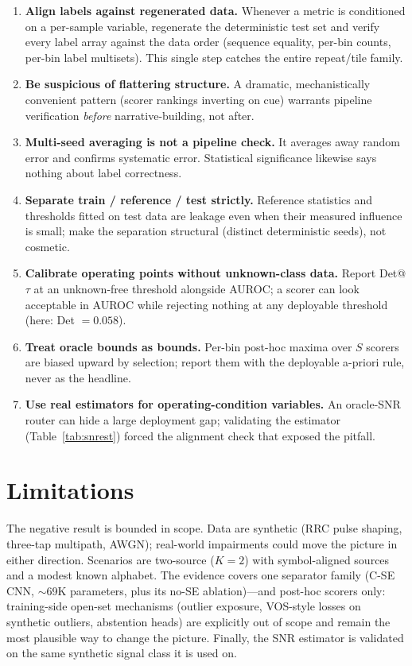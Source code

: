 \documentclass[review,12pt]{elsarticle}
\begin{document}
\begin{enumerate}
  \item \textbf{Align labels against regenerated data.} Whenever a
        metric is conditioned on a per-sample variable, regenerate the
        deterministic test set and verify every label array against the
        data order (sequence equality, per-bin counts, per-bin label
        multisets). This single step catches the entire repeat/tile
        family.
  \item \textbf{Be suspicious of flattering structure.} A dramatic,
        mechanistically convenient pattern (scorer rankings inverting
        on cue) warrants pipeline verification \emph{before}
        narrative-building, not after.
  \item \textbf{Multi-seed averaging is not a pipeline check.} It
        averages away random error and confirms systematic error.
        Statistical significance likewise says nothing about label
        correctness.
  \item \textbf{Separate train / reference / test strictly.} Reference
        statistics and thresholds fitted on test data are leakage even
        when their measured influence is small; make the separation
        structural (distinct deterministic seeds), not cosmetic.
  \item \textbf{Calibrate operating points without unknown-class
        data.} Report Det@$\tau$ at an unknown-free threshold alongside
        AUROC; a scorer can look acceptable in AUROC while rejecting
        nothing at any deployable threshold (here: Det $= 0.058$).
  \item \textbf{Treat oracle bounds as bounds.} Per-bin post-hoc maxima
        over $S$ scorers are biased upward by selection; report them
        with the deployable a-priori rule, never as the headline.
  \item \textbf{Use real estimators for operating-condition
        variables.} An oracle-SNR router can hide a large deployment
        gap; validating the estimator (Table~\ref{tab:snrest}) forced
        the alignment check that exposed the pitfall.
\end{enumerate}

\section{Limitations}
\label{sec:limit}

The negative result is bounded in scope. Data are synthetic (RRC pulse
shaping, three-tap multipath, AWGN); real-world impairments could move
the picture in either direction. Scenarios are two-source ($K{=}2$) with
symbol-aligned sources and a modest known alphabet. The evidence covers
one separator family (C-SE CNN, $\sim$69K parameters, plus its no-SE
ablation)---and
post-hoc scorers only: training-side open-set mechanisms (outlier
exposure, VOS-style losses on synthetic outliers, abstention heads) are
explicitly out of scope and remain the most plausible way to change
the picture.
Finally, the SNR estimator is validated on the same synthetic signal
class it is used on.
\end{document}
